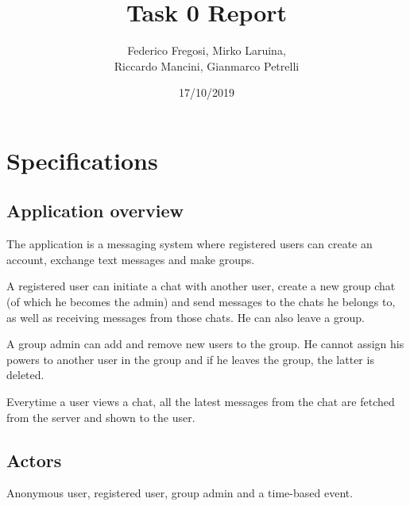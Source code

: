 \documentclass[10pt]{article}
\title{Task 0 Report}
\date{17/10/2019}
\author{Federico Fregosi, Mirko Laruina,\\
        Riccardo Mancini, Gianmarco Petrelli}
\begin{document}
\maketitle
\vfill
\tableofcontents
\vfill
\clearpage
\setcounter{page}{1}

\section{Specifications}
\subsection{Application overview}
The application is a messaging system where registered users can create an 
account, exchange text messages and make groups.

A registered user can initiate a chat with another user, create a new group chat
(of which he becomes the admin) and send messages to the chats he belongs to,
as well as receiving messages from those chats. He can also leave a group.

A group admin can add and remove new users to the group. He cannot assign his
powers to another user in the group and if he leaves the group, the latter 
is deleted.

Everytime a user views a chat, all the latest messages from the chat are fetched from 
the server and shown to the user.

\subsection{Actors}
Anonymous user, registered user, group admin and a time-based event.
\end{document}
